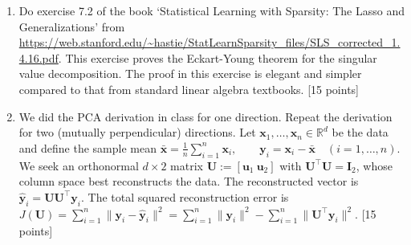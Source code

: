 \documentclass[11pt]{article}
\begin{document}
\begin{enumerate}
\item Do exercise 7.2 of the book `Statistical Learning with Sparsity: The Lasso and Generalizations' from \url{https://web.stanford.edu/~hastie/StatLearnSparsity_files/SLS_corrected_1.4.16.pdf}. This exercise proves the Eckart-Young theorem for the singular value decomposition. The proof in this exercise is elegant and simpler compared to that from standard linear algebra textbooks. \textsf{[15 points]}

\item We did the PCA derivation in class for one direction. Repeat the derivation for two (mutually perpendicular) directions. Let $\boldsymbol{x}_1,\dots,\boldsymbol{x}_n\in\mathbb{R}^d$ be the data and define the sample mean
$\bar{\boldsymbol{x}}=\frac{1}{n}\sum_{i=1}^n \boldsymbol{x}_i,
\qquad
\boldsymbol{y}_i=\boldsymbol{x}_i-\bar{\boldsymbol{x}}\quad (i=1,\dots,n)$.
We seek an orthonormal $d\times 2$ matrix $\boldsymbol{U}:=[\boldsymbol{u}_1\ \boldsymbol{u}_2]$ with $\boldsymbol{U}^\top\boldsymbol{U}=\boldsymbol{I}_2$, whose column space best reconstructs the data.
The reconstructed vector is $\hat{\boldsymbol{y}}_i=\boldsymbol{U}\boldsymbol{U}^\top\boldsymbol{y}_i$. The total squared reconstruction error is
$J(\boldsymbol{U})=\sum_{i=1}^n \|\boldsymbol{y}_i-\hat{\boldsymbol{y}}_i\|^2
= \sum_{i=1}^n \|\boldsymbol{y}_i\|^2 - \sum_{i=1}^n \|\boldsymbol{U}^\top\boldsymbol{y}_i\|^2$. \textsf{[15 points]}


\end{enumerate}
\end{document}
